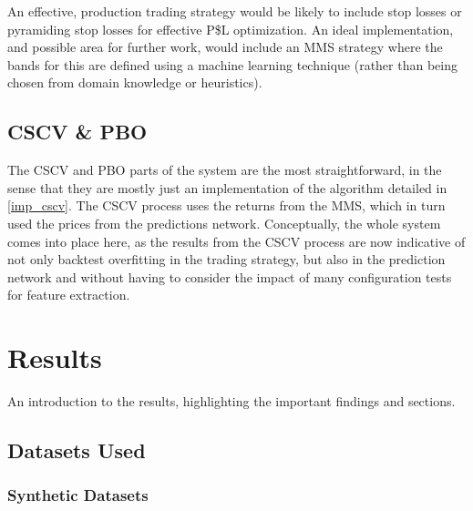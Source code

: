 \documentclass[a4paper,latin]{paper}
\begin{document}
An effective, production trading strategy would be likely to include stop losses or pyramiding stop losses for effective P\$L optimization. An ideal implementation, and possible area for further work, would include an MMS strategy where the bands for this are defined using a machine learning technique (rather than being chosen from domain knowledge or heuristics).\newline


\subsection{CSCV \& PBO}\label{proc_cscv}

The CSCV and PBO parts of the system are the most straightforward, in the sense that they are mostly just an implementation of the algorithm detailed in \ref{imp_cscv}. The CSCV process uses the returns from the MMS, which in turn used the prices from the predictions network. Conceptually, the whole system comes into place here, as the results from the CSCV process are now indicative of not only backtest overfitting in the trading strategy, but also in the prediction network and without having to consider the impact of many configuration tests for feature extraction.






























\newpage
\section{Results}\label{Results}

An introduction to the results, highlighting the important findings and sections. \todo{}

\subsection{Datasets Used}

\subsubsection{Synthetic Datasets}
\end{document}
